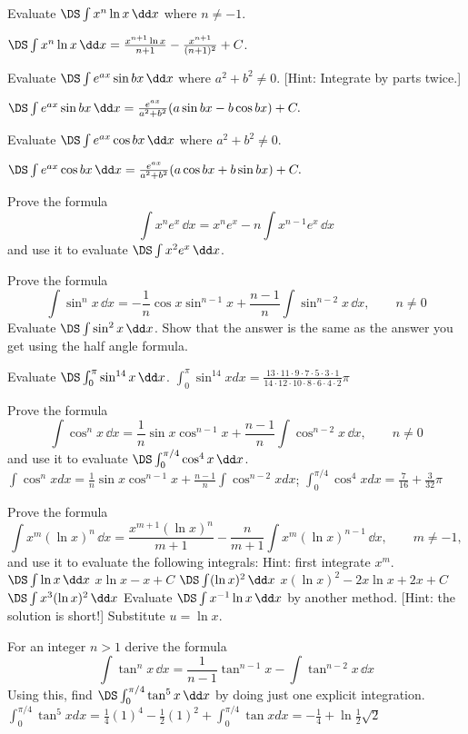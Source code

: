 \problem Evaluate $\DS \int x^n \ln x\,\dd x$ where $n\ne-1$.

\answer
$\DS \int x^n \ln x\,\dd x
= \frac{x^{n+1}\ln x}{n+1} - \frac{x^{n+1}}{(n+1)^2}+C$.
\endanswer

\problem Evaluate $\DS \int e^{ax}\sin bx\,\dd x$ where $a^2+b^2\ne
0$.  [Hint: Integrate by parts twice.]

\answer
$\DS\int e^{ax}\sin bx\,\dd x= \frac{e^{ax}}{a^2+b^2}(a\sin bx
-b\cos bx)+C.$
\endanswer

\problem Evaluate $\DS\int e^{ax}\cos bx\,\dd x$ where $a^2+b^2\ne 0$.

\answer
$\DS\int e^{ax}\cos bx\,\dd x
= \frac{e^{ax}}{a^2+b^2}(a\cos bx+b\sin bx)+C.$
\endanswer



\problem Prove the formula
\[
\int x^n e^x\,\dd x= x^ne^x-n\int x^{n-1}e^x\,\dd x
\]
and use it to evaluate $\DS\int x^2e^x\,\dd x$.

\problem Prove the formula
\[
\int \sin^nx\,\dd x
= -\frac1n{\cos x\sin^{n-1}x}
+\frac{n-1}{n}\int\sin^{n-2}x\,\dd x,\qquad n\ne0
\]
\problem Evaluate $\DS\int\sin^2x\,\dd x$.  Show that the answer
is the same as the answer you get using the half angle formula.

\problem Evaluate $\DS\int_0^\pi\sin^{14}x\,\dd x$.
\answer
$\int_0^{\pi} \sin^{14}x dx = \frac{13\cdot11\cdot9\cdot7\cdot5\cdot3\cdot1 }
{14\cdot12\cdot10\cdot8\cdot6\cdot4\cdot2}\pi$
\endanswer

\problem Prove the formula
\[
\int \cos^nx\,\dd x
= \frac1n{\sin x\cos^{n-1}x}
+\frac{n-1}{n}\int\cos^{n-2}x\,\dd x,\qquad n\ne0
\]
and use it to evaluate $\DS\int_0^{\pi/4}\cos^4x\,\dd x$.
\answer
$\int \cos^n x dx = \frac1n\sin x \cos^{n-1}x
+\frac{n-1}n\int\cos^{n-2}x dx$;
$\int_0^{\pi/4}\cos^4 x dx = \frac7{16}+ \frac3{32}\pi$
\endanswer

\problem Prove the formula
\[
\int x^m(\ln x)^n\,\dd x= \frac{x^{m+1}(\ln
x)^n}{m+1}-\frac{n}{m+1}\int x^m(\ln x)^{n-1}\,\dd x,
\qquad m\ne -1,
\]
and use it to evaluate the following integrals:
\answer
Hint: first integrate $x^m$.
\endanswer
\problem $\DS\int \ln x\,\dd x$
\answer
$x\ln x-x+C$
\endanswer
\problem $\DS\int (\ln x)^2\,\dd x$
\answer
$x(\ln x)^2-2x\ln x+2x+C$
\endanswer
\problem $\DS\int x^3(\ln x)^2\,\dd x$
\problem Evaluate $\DS\int x^{-1}\ln x\,\dd x$ by another
method. [Hint: the solution is short!]
\answer
Substitute $u=\ln x$.
\endanswer

\problem For an integer $n > 1$ derive the formula
\[
\int \tan^n x\,\dd x=\frac 1{n-1}\tan^{n-1}x-\int \tan^{n-2}x\,\dd x
\]
Using this, find $\DS\int_0^{\pi/4} \tan^5x\,\dd x$ by doing just one
explicit integration.
\answer
$\int_0^{\pi/4}\tan^5 xdx =
\frac14(1)^4-\frac12(1)^2 + \int_0^{\pi/4}\tan x dx =
-\frac14+\ln\frac12\surd2$
\endanswer

